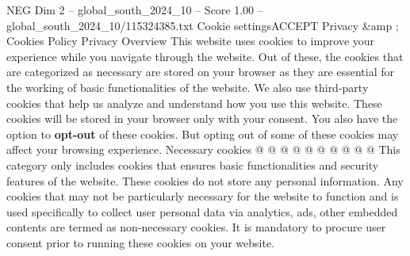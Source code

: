 \begin{textsample}{NEG Dim 2 – global\_south\_2024\_10 – Score 1.00 – global\_south\_2024\_10/115324385.txt}
Cookie settingsACCEPT Privacy \&amp ; Cookies Policy Privacy Overview This website uses cookies to improve your experience while you navigate through the website.
Out of these, the cookies that are categorized as necessary are stored on your browser as they are essential for the working of basic functionalities of the website.
We also use third-party cookies that help us analyze and understand how you use this website.
These cookies will be stored in your browser only with your consent.
You also have the option to \textbf{opt-out} of these cookies.
But opting out of some of these cookies may affect your browsing experience.
Necessary cookies @ @ @ @ @ @ @ @ @ @ This category only includes cookies that ensures basic functionalities and security features of the website.
These cookies do not store any personal information.
Any cookies that may not be particularly necessary for the website to function and is used specifically to collect user personal data via analytics, ads, other embedded contents are termed as non-necessary cookies.
It is mandatory to procure user consent prior to running these cookies on your website.

\end{textsample}
